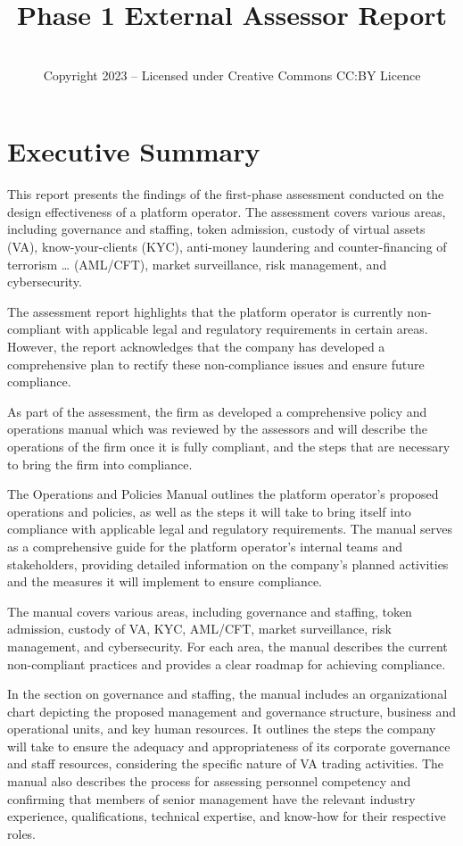 \documentclass[]{report}
\title{Phase 1 External Assessor Report}
\author{\firmfullname\\Copyright 2023 – Licensed under Creative
  Commons CC:BY Licence}
\begin{document}
\maketitle

\chapter{Executive Summary}
This report presents the findings of the first-phase assessment
conducted on the design effectiveness of a platform operator. The
assessment covers various areas, including governance and staffing,
token admission, custody of virtual assets (VA), know-your-clients
(KYC), anti-money laundering and counter-financing of terrorism
… (AML/CFT), market surveillance, risk management, and
cybersecurity.

The assessment report highlights that the platform operator is
currently non-compliant with applicable legal and regulatory
requirements in certain areas. However, the report acknowledges that
the company has developed a comprehensive plan to rectify these
non-compliance issues and ensure future compliance.

As part of the assessment, the firm as developed a comprehensive
policy and operations manual which was reviewed by the assessors and
will describe the operations of the firm once it is fully compliant,
and the steps that are necessary to bring the firm into compliance.

The Operations and Policies Manual outlines the platform operator's
proposed operations and policies, as well as the steps it will take to
bring itself into compliance with applicable legal and regulatory
requirements. The manual serves as a comprehensive guide for the
platform operator's internal teams and stakeholders, providing
detailed information on the company's planned activities and the
measures it will implement to ensure compliance.

The manual covers various areas, including governance and staffing,
token admission, custody of VA, KYC, AML/CFT, market surveillance,
risk management, and cybersecurity. For each area, the manual
describes the current non-compliant practices and provides a clear
roadmap for achieving compliance.

In the section on governance and staffing, the manual includes an
organizational chart depicting the proposed management and governance
structure, business and operational units, and key human resources. It
outlines the steps the company will take to ensure the adequacy and
appropriateness of its corporate governance and staff resources,
considering the specific nature of VA trading activities. The
manual also describes the process for assessing personnel competency
and confirming that members of senior management have the relevant
industry experience, qualifications, technical expertise, and know-how
for their respective roles.
\end{document}
